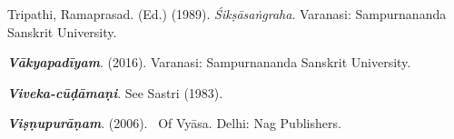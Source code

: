 \begin{thebibliography}{99}
  Tripathi, Ramaprasad. (Ed.) (1989). \textit{Śikṣāsaṅgraha}. Varanasi: Sampurnananda Sanskrit University. 

  \textbf{\textit{Vākyapadīyam}}. (2016). Varanasi: Sampurnananda Sanskrit University.

  \textbf{\textit{Viveka-cūḍāmaṇi}}. See Sastri (1983).

  \textbf{\textit{Viṣṇupurāṇam}}. (2006).  Of Vyāsa. Delhi: Nag Publishers. \\

 \end{thebibliography}

\theendnotes

\label{endchapter3}
